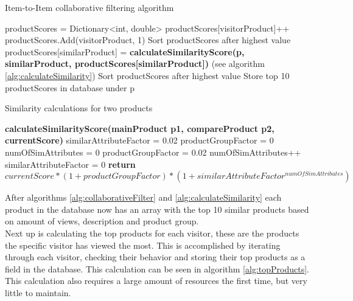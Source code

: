 \begin{algorithm}[H]
\caption{Item-to-Item collaborative filtering algorithm}
\label{alg:collaborativeFilter}
\begin{algorithmic}[!H]
\State productScores = Dictionary<int, double>
\State productScores[visitorProduct]++
\Else
\State productScores.Add(visitorProduct, 1)
\EndIf
\EndFor
\EndFor
\State Sort productScores after highest value
\State productScores[similarProduct] = \textbf{calculateSimilarityScore(p, similarProduct, productScores[similarProduct])} (see algorithm \ref{alg:calculateSimilarity})
\EndFor
\State Sort productScores after highest value
\State Store top 10 productScores in database under p
\EndFor
\end{algorithmic}
\end{algorithm}

\begin{algorithm}[H]
\caption{Similarity calculations for two products }
\label{alg:calculateSimilarity}
\begin{algorithmic}[!H]

\State \textbf{calculateSimilarityScore(mainProduct p1, compareProduct p2, currentScore)}
\State similarAttributeFactor = 0.02
\State productGroupFactor = 0
\State numOfSimAttributes = 0
\State productGroupFactor = 0.02
\EndIf
{}
\State numOfSimAttributes++
\EndIf
\EndFor
{}
\State similarAttributeFactor = 0
\EndIf
\State \textbf{return} \begin{math} currentScore * (1+productGroupFactor)*(1+similarAttributeFactor^{numOfSimAttributes}) \end{math}
\end{algorithmic}
\end{algorithm}


After algorithms \ref{alg:collaborativeFilter} and \ref{alg:calculateSimilarity} each product in the database now has an array with the top 10 similar products based on amount of views, description and product group. \\
Next up is calculating the top products for each visitor, these are the products the specific visitor has viewed the most. This is accomplished by iterating through each visitor, checking their behavior and storing their top products as a field in the database. This calculation can be seen in algorithm \ref{alg:topProducts}. This calculation also requires a large amount of resources the first time, but very little to maintain.

